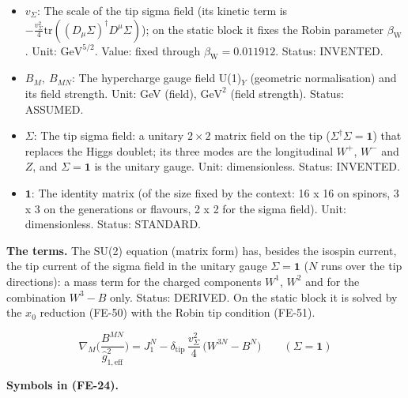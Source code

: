 \documentclass[
  10pt,
]{article}
\begin{document}
\begin{itemize}
  delta function at the tip with the proper length of the hidden
  direction). Unit: 1/length. Status: DERIVED.
\item
  \(v_\Sigma\): The scale of the tip sigma field (its kinetic term is
  \(-\frac{v_\Sigma^2}{4}\mathrm{tr}((D_\mu\Sigma)^\dagger D^\mu\Sigma)\));
  on the static block it fixes the Robin parameter
  \(\beta_{\mathrm{W}}\). Unit: \(\mathrm{GeV}^{5/2}\). Value: fixed
  through \(\beta_{\mathrm{W}} = 0.011912\). Status: INVENTED.
\item
  \(B_M,\ B_{MN}\): The hypercharge gauge field U(1)\(_Y\) (geometric
  normalisation) and its field strength. Unit: GeV (field),
  \(\mathrm{GeV}^{2}\) (field strength). Status: ASSUMED.
\item
  \(\Sigma\): The tip sigma field: a unitary \(2 \times 2\) matrix field
  on the tip (\(\Sigma^\dagger\Sigma = \mathbf{1}\)) that replaces the
  Higgs doublet; its three modes are the longitudinal \(W^+\), \(W^-\)
  and \(Z\), and \(\Sigma = \mathbf{1}\) is the unitary gauge. Unit:
  dimensionless. Status: INVENTED.
\item
  \(\mathbf{1}\): The identity matrix (of the size fixed by the context:
  16 x 16 on spinors, 3 x 3 on the generations or flavours, 2 x 2 for
  the sigma field). Unit: dimensionless. Status: STANDARD.
\end{itemize}

\textbf{The terms.} The SU(2) equation (matrix form) has, besides the
isospin current, the tip current of the sigma field in the unitary gauge
\(\Sigma = \mathbf{1}\) (\(N\) runs over the tip directions): a mass
term for the charged components \(W^1\), \(W^2\) and for the combination
\(W^3 - B\) only. Status: DERIVED. On the static block it is solved by
the \(x_0\) reduction (FE-50) with the Robin tip condition (FE-51).

\[
\nabla_M\Big(\frac{B^{MN}}{\hat g_{1,\mathrm{eff}}^2}\Big) = J_1^N -
 \delta_{\mathrm{tip}}\,\frac{v_\Sigma^2}{4}\,
 \big(W^{3N} - B^N\big)\qquad (\Sigma = \mathbf{1}) \tag{FE-24}
\]

\textbf{Symbols in (FE-24).}
\end{document}
